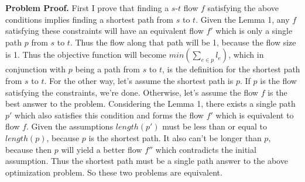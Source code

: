 \documentclass[letterpaper,12pt]{article}
\begin{document}
\begin{enumerate}
\begin{enumerate}
	\textbf{Problem Proof.} First I prove that finding a $s$-$t$ flow $f$ satisfying the above conditions implies finding a shortest path from $s$ to $t$. Given the Lemma 1, any $f$ satisfying these constraints will have an equivalent flow $f'$ which is only a single path $p$ from $s$ to $t$. Thus the flow along that path will be 1, because the flow size is 1. Thus the objective function will become $min (\sum_{e\in{}p}l_e)$, which in conjunction with $p$ being a path from $s$ to $t$, is the definition for the shortest path from $s$ to $t$. For the other way, let's assume the shortest path is $p$. If $p$ is the flow satisfying the constraints, we're done. Otherwise, let's assume the flow $f$ is the best answer to the problem. Considering the Lemma 1, there exists a single path $p'$ which also satisfies this condition and forms the flow $f'$ which is equivalent to flow $f$. Given the assumptions $length(p')$ must be less than or equal to $length(p)$, because $p$ is the shortest path. It also can't be longer than $p$, because then $p$ will yield a better flow $f''$ which contradicts the initial assumption. Thus the shortest path must be a single path answer to the above optimization problem. So these two problems are equivalent.
	

\end{enumerate}
\end{enumerate}
\end{document}
